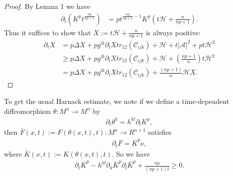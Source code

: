 \documentclass{amsart}
\theoremstyle{definition}
\theoremstyle{remark}
\numberwithin{equation}{section}
\begin{document}
\begin{proof}
By Lemma 1 we have
\begin{align*}
\partial_t \left(K^{ p }t^{\frac{n p }{n p +1}}\right)&= p  t^{\frac{n p }{n p +1}-1}K^{ p }\left(t\mathcal{H}+\frac{n}{n p +1}\right).
\end{align*}
Thus it suffices to show that $X:=t\mathcal{H}+\frac{n}{n p +1}$ is always positive:
\begin{align*}
\partial_t X&= p \Delta X+ p  g^{lk}\partial_lX tr_{12}(\mathcal{C}_{ijk})+\mathcal{H}+t|\mathcal{A}|^2+ p  t \mathcal{H}^2\\
&\geq  p \Delta X+ p  g^{lk}\partial_lX tr_{12}(\mathcal{C}_{ijk})+\mathcal{H}+(\frac{n p +1}{n})t \mathcal{H}^2\\
&= p \Delta X+ p  g^{lk}\partial_lX tr_{12}(\mathcal{C}_{ijk})+\frac{(n p +1)}{n}\mathcal{H}X.
\end{align*}
\end{proof}
To get the usual Harnack estimate, we note if we define a time-dependent diffeomorphism $\theta: M^n\to M^n$ by
\begin{align}
\partial_t\theta^k=h^{kl}\partial_l K^{ p },
\end{align}
then $\bar{F}(x,t):=F(\theta(x,t),t):M^{n}\to R^{n+1}$ satisfies
\begin{align}
\partial_t\bar{F}=\bar{K}^{ p }\nu,
\end{align}
where $\bar{K}(x,t):=K(\theta(x,t),t)$. So we have
\begin{align}
\partial_t\bar{K}^{ p }-h^{kl}\partial_k\bar{K}^{ p }\partial_l\bar{K}^{ p }+\frac{n p }{(n p +1)t}\geq 0.
\end{align}
\end{document}
